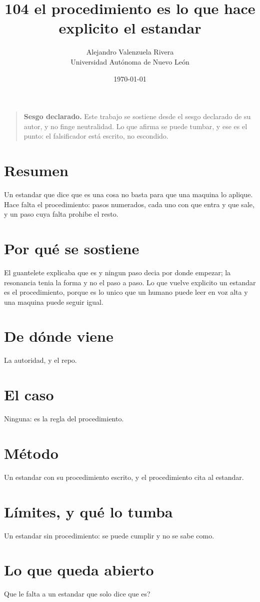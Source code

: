 \documentclass[11pt,a4paper]{article}
\title{104 el procedimiento es lo que hace explicito el estandar}
\author{Alejandro Valenzuela Rivera\\\small Universidad Autónoma de Nuevo León}
\date{\today}
\begin{document}
\maketitle

\begin{quote}
\textbf{Sesgo declarado.} Este trabajo se sostiene desde el sesgo declarado de su autor, y no finge neutralidad. Lo que afirma se puede tumbar, y ese es el punto: el falsificador está escrito, no escondido.
\end{quote}

\section*{Resumen}
Un estandar que dice que es una cosa no basta para que una maquina lo aplique. Hace falta el procedimiento: pasos numerados, cada uno con que entra y que sale, y un paso cuya falta prohibe el resto.

\section{Por qué se sostiene}
El guantelete explicaba que es y ningun paso decia por donde empezar; la resonancia tenia la forma y no el paso a paso. Lo que vuelve explicito un estandar es el procedimiento, porque es lo unico que un humano puede leer en voz alta y una maquina puede seguir igual.

\section{De dónde viene}
La autoridad, y el repo.

\section{El caso}
Ninguna: es la regla del procedimiento.

\section{Método}
Un estandar con su procedimiento escrito, y el procedimiento cita al estandar.

\section{Límites, y qué lo tumba}
Un estandar sin procedimiento: se puede cumplir y no se sabe como.

\section{Lo que queda abierto}
\textquestiondown{}Que le falta a un estandar que solo dice que es?
\end{document}
